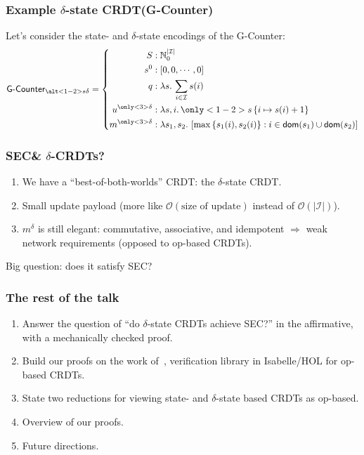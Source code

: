 \documentclass[aspectratio=169,compress,handout]{beamer}
\newcommand*{\CRDT}{\textsf{CRDT}\xspace}
\newcommand*{\CRDTs}{\textsf{CRDTs}\xspace}
\newcommand*{\SEC}{\textsf{SEC}\xspace}
\begin{document}
  \begin{frame}
    \frametitle{Example $\delta$-state \CRDT (G-Counter)}

    Let's consider the state- and $\delta$-state encodings of the G-Counter:
    \pause
    \[
      \textsf{G-Counter}_{\alt<1-2>{s}{\delta}} = \left\{\begin{aligned}
        S &: \mathbb{N}_0^{|\mathcal{I}|} \\
        s^0 &: \left[ 0, 0, \cdots, 0 \right] \\
        q &: \lambda s.\, \sum_{i \in \mathcal{I}} s(i) \\
        u^{\only<3>{\delta}} &: \lambda s,i.\, \only<1-2>{s}\left\{ i \mapsto s(i) + 1 \right\} \\
        m^{\only<3>{\delta}} &: \lambda s_1, s_2.\, \left[ \max\left\{ s_1(i), s_2(i) \right\}: i \in \mathsf{dom}(s_1) \cup
        \mathsf{dom}(s_2) \right]
      \end{aligned}\right.
    \]
    \pause
  \end{frame}

  \begin{frame}
    \frametitle{\SEC \& $\delta$-\CRDTs?}

    \begin{enumerate}[<+->]
      \item We have a ``best-of-both-worlds'' \CRDT: the $\delta$-state \CRDT.
      \item Small update payload (more like $\mathcal{O}(\text{size of update})$
        instead of $\mathcal{O}(|\mathcal{I}|)$).
      \item $m^\delta$ is still elegant: commutative, associative, and
        idempotent $\Rightarrow$ weak network requirements (opposed to op-based
        \CRDTs).
    \end{enumerate}

    \pause
    Big question: does it satisfy SEC?
  \end{frame}

  \begin{frame}
    \frametitle{The rest of the talk}
    \begin{enumerate}[<+->]
      \item Answer the question of ``do $\delta$-state \CRDTs achieve \SEC?'' in
        the affirmative, with a mechanically checked proof.
      \item Build our proofs on the work of~\citet{gomes17}, verification
        library in Isabelle/HOL for op-based \CRDTs.
      \item State two reductions for viewing state- and $\delta$-state based
        \CRDTs as op-based.
      \item Overview of our proofs.
      \item Future directions.
    \end{enumerate}
  \end{frame}
\end{document}
